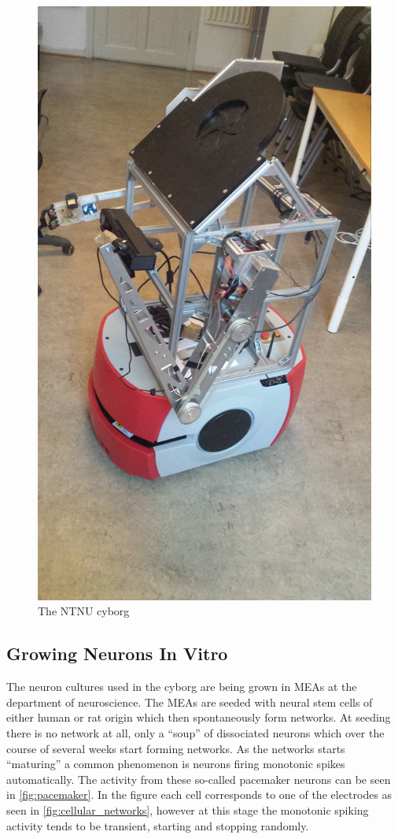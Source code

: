 \begin{figure}[h!]
    \includegraphics[width=\linewidth]{images/kybrg.jpg}
    \caption{The NTNU cyborg}
    \label{fig:cyborg}
\end{figure}
\subsection{Growing Neurons In Vitro}
The neuron cultures used in the cyborg are being grown in MEAs
at the department of neuroscience.
The MEAs are seeded with neural stem cells of either human or rat origin which
then spontaneously form networks.
At seeding there is no network at all, only a ``soup'' of dissociated neurons
which over the course of several weeks start forming networks.
As the networks starts ``maturing'' a common phenomenon is neurons firing
monotonic spikes automatically.
The activity from these so-called pacemaker neurons can be seen in \ref{fig:pacemaker}.
In the figure each cell corresponds to one of the electrodes as seen in
\ref{fig:cellular_networks}, however at this stage the monotonic spiking
activity tends to be transient, starting and stopping randomly.
